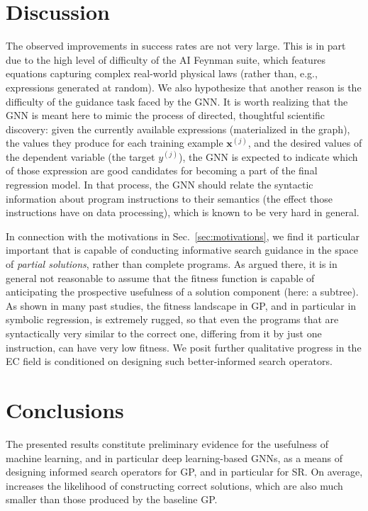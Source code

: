 \section{Discussion}\label{sec:discuss}

The observed improvements in success rates are not very large. This is in part due to the high level of difficulty of the AI Feynman suite, which features equations capturing complex real-world physical laws (rather than, e.g., expressions generated at random). We also hypothesize that another reason is the difficulty of the guidance task faced by the GNN. It is worth realizing that the GNN is meant here to mimic the process of directed, thoughtful scientific discovery: given the currently available expressions (materialized in the graph), the values they produce for each training example $\mathbf{x}^{(j)}$, and the desired values of the dependent variable (the target $y^{(j)}$), the GNN is expected to indicate which of those expression are good candidates for becoming a part of the final regression model. In that process, the GNN should relate the syntactic information about program instructions to their semantics (the effect those instructions have on data processing), which is known to be very hard in general. 

In connection with the motivations in Sec.\ \ref{sec:motivations}, we find it particular important that \mname is capable of conducting informative search guidance in the space of \emph{partial solutions}, rather than complete programs. As argued there, it is in general not reasonable to assume that the fitness function is capable of anticipating the prospective usefulness of a solution component (here: a subtree). As shown in many past studies, the fitness landscape in GP, and in particular in symbolic regression, is extremely rugged, so that even the programs that are syntactically very similar to the correct one, differing from it by just one instruction, can have very low fitness. We posit further qualitative progress in the EC field is conditioned on designing such better-informed search operators. 


\section{Conclusions}\label{sec:conclusions}

The presented results constitute preliminary evidence for the usefulness of machine learning, and in particular deep learning-based GNNs, as a means of designing informed search operators for GP, and in particular for SR. On average, \mname increases the likelihood of constructing correct solutions, which are also much smaller than those produced by the baseline GP. 

